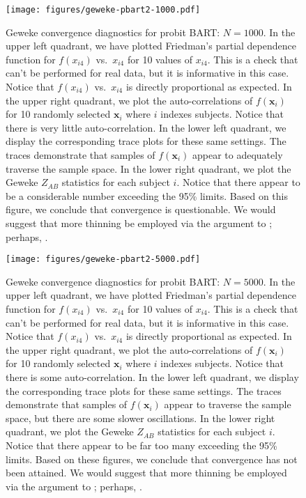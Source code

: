 \documentclass[article]{jss}
\begin{document}
\begin{figure}%
\begin{center}
\texttt{[image: figures/geweke-pbart2-1000.pdf]}
\end{center}
\caption{\label{geweke-pbart2-1000}Geweke convergence diagnostics for
  probit BART: $N=1000$.  In the upper left quadrant, we have plotted
  Friedman's partial dependence function for $f(x_{i4})$ vs.\ $x_{i4}$
  for 10 values of $x_{i4}$.  This is a check that can't be performed
  for real data, but it is informative in this case.  Notice that
  $f(x_{i4})$ vs.\ $x_{i4}$ is directly proportional as expected.  In
  the upper right quadrant, we plot the auto-correlations of
  $f(\bm{x}_i)$ for 10 randomly selected $\bm{x}_i$ where $i$ indexes
  subjects.  Notice that there is very little auto-correlation.  In
  the lower left quadrant, we display the corresponding trace plots
  for these same settings.  The traces demonstrate that samples of
  $f(\bm{x}_i)$ appear to adequately traverse the sample space.  In
  the lower right quadrant, we plot the Geweke $Z_{AB}$ statistics for
  each subject $i$.  Notice that there appear to be a considerable
  number exceeding the 95\% limits.  Based on this figure, we conclude
  that convergence is questionable.  We would suggest that more
  thinning be employed via the  argument to
  ; perhaps, .  }
\end{figure}

\begin{figure}%
\begin{center}
\texttt{[image: figures/geweke-pbart2-5000.pdf]}
\end{center}
\caption{\label{geweke-pbart2-5000}Geweke convergence diagnostics for
  probit BART: $N=5000$.  In the upper left quadrant, we have plotted
  Friedman's partial dependence function for $f(x_{i4})$ vs.\ $x_{i4}$
  for 10 values of $x_{i4}$.  This is a check that can't be performed
  for real data, but it is informative in this case.  Notice that
  $f(x_{i4})$ vs.\ $x_{i4}$ is directly proportional as expected.  In
  the upper right quadrant, we plot the auto-correlations of
  $f(\bm{x}_i)$ for 10 randomly selected $\bm{x}_i$ where $i$ indexes
  subjects.  Notice that there is some auto-correlation.  In the lower
  left quadrant, we display the corresponding trace plots for these
  same settings.  The traces demonstrate that samples of $f(\bm{x}_i)$
  appear to traverse the sample space, but there are some slower
  oscillations.  In the lower right quadrant, we plot the Geweke
  $Z_{AB}$ statistics for each subject $i$.  Notice that there appear
  to be far too many exceeding the 95\% limits.  Based on these
  figures, we conclude that convergence has not been attained.  We
  would suggest that more thinning be employed via the
   argument to ; perhaps,
  .  }
\end{figure}
\end{document}
